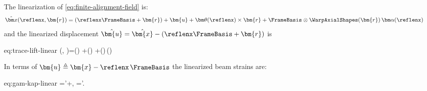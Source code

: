 
\begin{remark}
The linearization of \eqref{eq:finite-alignment-field} is:
\begin{equation}
\hat{\bm x}(\reflenx, \bm{r})=(\reflenx\FrameBasis+\bm{r})
+\bm{u} + \bm\theta(\reflenx)\times\bm{r}
+\FrameBasis\otimes\WarpAxialShapes(\bm{r})\,\bm\alpha(\reflenx)
\label{eq:linear-alignment-field}
\end{equation}
and the linearized displacement \(\hat{\bm{u}} = \hat{\bm{x}} - (\reflenx\FrameBasis + \bm{r})\) is
\begin{SaveEquation}{eq:trace-lift-linear}
(, )=()
+\bm\theta()\times{}
+\FrameBasis\otimes\WarpAxialShapes()\,\bm\alpha()
\end{SaveEquation}
In terms of \(\bm{u}\triangleq\bm{x}- \reflenx\,\FrameBasis\) the linearized beam strains are:
\begin{SaveEquation}{eq:gam-kap-linear}
\bm{\gamma}='+\FrameBasis\times\bm\theta,\qquad
\bm{\kappa}=\bm\theta'.
\end{SaveEquation}
\end{remark}

